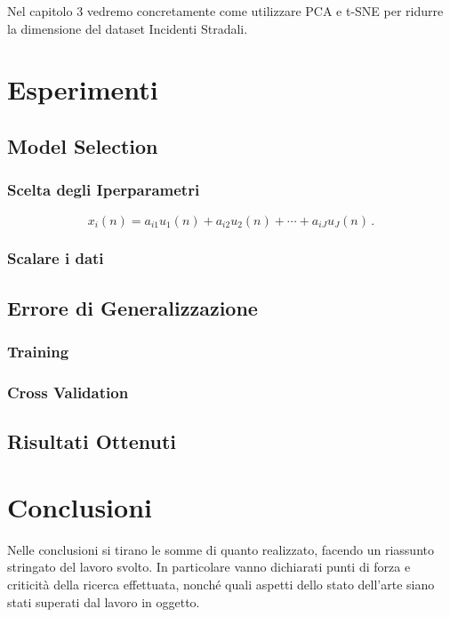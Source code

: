 \documentclass[12pt,italian]{report}
\begin{document}
Nel capitolo 3 vedremo concretamente come utilizzare PCA e t-SNE per ridurre la dimensione del dataset Incidenti Stradali.



% 
% 

\chapter{Esperimenti}
\label{cap3}


\section{Model Selection}

\subsection{Scelta degli Iperparametri}

\begin{equation}
x_i(n) = a_{i1}u_1(n) + a_{i2}u_2(n) + \cdots + a_{iJ}u_J(n) \, .
\label{eq:multimix}
\end{equation}

\subsection{Scalare i dati}


\section{Errore di Generalizzazione}
\label{sec:errore}


\subsection{Training}



\subsection{Cross Validation}



\section{Risultati Ottenuti}
\label{sec:risultati}


% 
% 
\chapter{Conclusioni}

Nelle conclusioni si tirano le somme di quanto realizzato, facendo un riassunto stringato del lavoro svolto. In particolare vanno dichiarati punti di forza e criticità della ricerca effettuata, nonché quali aspetti dello stato dell'arte siano stati superati dal lavoro in oggetto.

%
%



\end{document}
